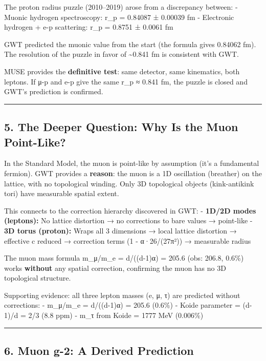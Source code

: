 \documentclass[
]{article}
\begin{document}
The proton radius puzzle (2010--2019) arose from a discrepancy between:
- Muonic hydrogen spectroscopy: r\_p = 0.84087 ± 0.00039 fm - Electronic
hydrogen + e-p scattering: r\_p = 0.8751 ± 0.0061 fm

GWT predicted the muonic value from the start (the formula gives 0.84062
fm). The resolution of the puzzle in favor of \textasciitilde0.841 fm is
consistent with GWT.

MUSE provides the \textbf{definitive test}: same detector, same
kinematics, both leptons. If μ-p and e-p give the same r\_p ≈ 0.841 fm,
the puzzle is closed and GWT's prediction is confirmed.

\begin{center}\rule{0.5\linewidth}{0.5pt}\end{center}

\subsection{5. The Deeper Question: Why Is the Muon
Point-Like?}\label{the-deeper-question-why-is-the-muon-point-like}

In the Standard Model, the muon is point-like by assumption (it's a
fundamental fermion). GWT provides a \textbf{reason}: the muon is a 1D
oscillation (breather) on the lattice, with no topological winding. Only
3D topological objects (kink-antikink tori) have measurable spatial
extent.

This connects to the correction hierarchy discovered in GWT: -
\textbf{1D/2D modes (leptons):} No lattice distortion → no corrections
to bare values → point-like - \textbf{3D torus (proton):} Wraps all 3
dimensions → local lattice distortion → effective c reduced → correction
terms (1 - α·26/(27π²)) → measurable radius

The muon mass formula m\_μ/m\_e = d/((d-1)α) = 205.6 (obs: 206.8, 0.6\%)
works \textbf{without} any spatial correction, confirming the muon has
no 3D topological structure.

Supporting evidence: all three lepton masses (e, μ, τ) are predicted
without corrections: - m\_μ/m\_e = d/((d-1)α) = 205.6 (0.6\%) - Koide
parameter = (d-1)/d = 2/3 (8.8 ppm) - m\_τ from Koide = 1777 MeV
(0.006\%)

\begin{center}\rule{0.5\linewidth}{0.5pt}\end{center}

\subsection{6. Muon g-2: A Derived
Prediction}\label{muon-g-2-a-derived-prediction}
\end{document}
